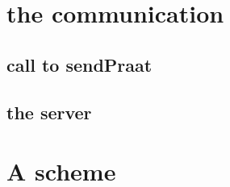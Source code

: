 \documentclass[12pt]{report}
\begin{document}
\chapter{the communication}
\section{call to sendPraat}
\section{the server}
\appendix
\chapter{A scheme}

\listoffigures
\listoftables

 
\end{document}

